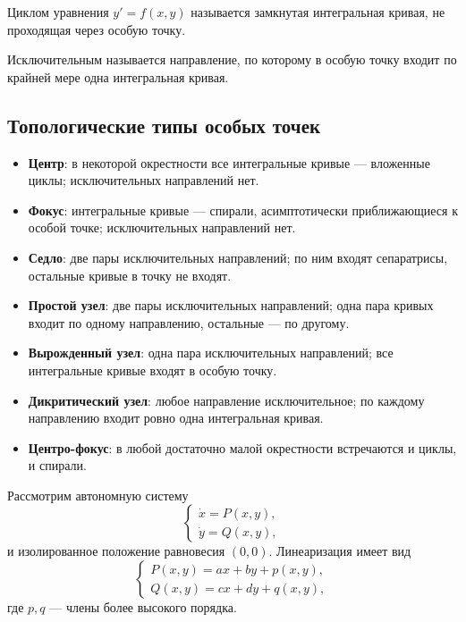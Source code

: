 \documentclass[12pt,a4paper]{article}
\numberwithin{equation}{section}
\begin{document}
\begin{definitionHSE}[Цикл]
Циклом уравнения $y'=f(x,y)$ называется замкнутая интегральная кривая, не проходящая через особую точку.
\end{definitionHSE}

\begin{definitionHSE}
Исключительным называется направление, по которому в особую точку входит по крайней мере одна интегральная кривая.
\end{definitionHSE}

\subsection{Топологические типы особых точек}
\begin{itemize}
  \item \textbf{Центр}: в некоторой окрестности все интегральные кривые --- вложенные циклы; исключительных направлений нет.
  \item \textbf{Фокус}: интегральные кривые --- спирали, асимптотически приближающиеся к особой точке; исключительных направлений нет.
  \item \textbf{Седло}: две пары исключительных направлений; по ним входят сепаратрисы, остальные кривые в точку не входят.
  \item \textbf{Простой узел}: две пары исключительных направлений; одна пара кривых входит по одному направлению, остальные --- по другому.
  \item \textbf{Вырожденный узел}: одна пара исключительных направлений; все интегральные кривые входят в особую точку.
  \item \textbf{Дикритический узел}: любое направление исключительное; по каждому направлению входит ровно одна интегральная кривая.
  \item \textbf{Центро-фокус}: в любой достаточно малой окрестности встречаются и циклы, и спирали.
\end{itemize}

Рассмотрим автономную систему
\[
\begin{cases}
\dot x=P(x,y),\\
\dot y=Q(x,y),
\end{cases}
\]
и изолированное положение равновесия $(0,0)$. Линеаризация имеет вид
\[
\begin{cases}
P(x,y)=ax+by+p(x,y),\\
Q(x,y)=cx+dy+q(x,y),
\end{cases}
\]
где $p,q$ --- члены более высокого порядка.
\end{document}
